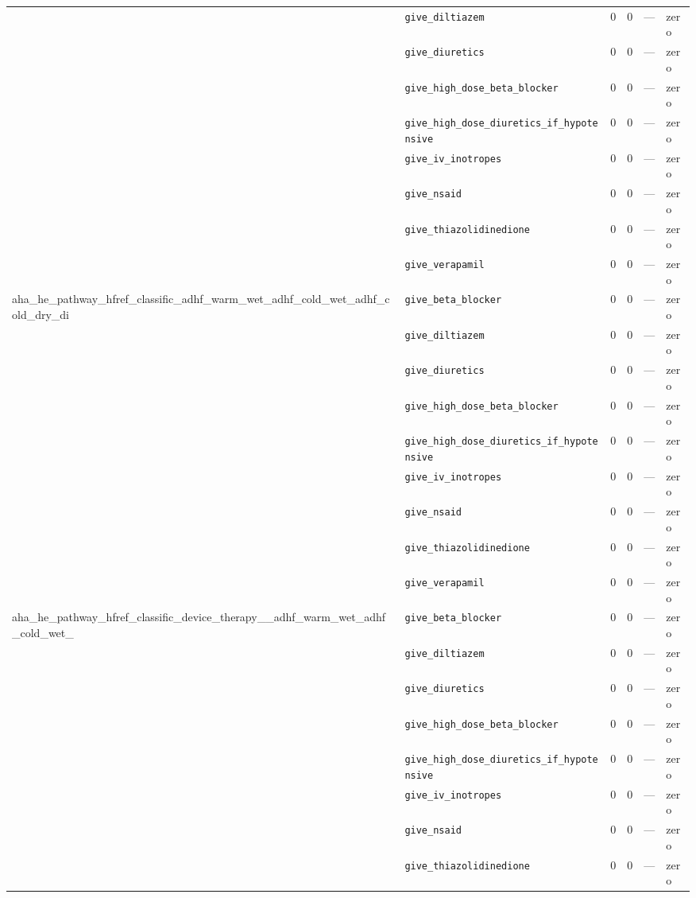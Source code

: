 \begin{table}[ht]
\begin{tabular}{llrrrl}
 & \texttt{give\_diltiazem} & 0 & 0 & — & zero \\
 & \texttt{give\_diuretics} & 0 & 0 & — & zero \\
 & \texttt{give\_high\_dose\_beta\_blocker} & 0 & 0 & — & zero \\
 & \texttt{give\_high\_dose\_diuretics\_if\_hypotensive} & 0 & 0 & — & zero \\
 & \texttt{give\_iv\_inotropes} & 0 & 0 & — & zero \\
 & \texttt{give\_nsaid} & 0 & 0 & — & zero \\
 & \texttt{give\_thiazolidinedione} & 0 & 0 & — & zero \\
 & \texttt{give\_verapamil} & 0 & 0 & — & zero \\
\midrule
aha\_he\_pathway\_hfref\_classific\_adhf\_warm\_wet\_adhf\_cold\_wet\_adhf\_cold\_dry\_di & \texttt{give\_beta\_blocker} & 0 & 0 & — & zero \\
 & \texttt{give\_diltiazem} & 0 & 0 & — & zero \\
 & \texttt{give\_diuretics} & 0 & 0 & — & zero \\
 & \texttt{give\_high\_dose\_beta\_blocker} & 0 & 0 & — & zero \\
 & \texttt{give\_high\_dose\_diuretics\_if\_hypotensive} & 0 & 0 & — & zero \\
 & \texttt{give\_iv\_inotropes} & 0 & 0 & — & zero \\
 & \texttt{give\_nsaid} & 0 & 0 & — & zero \\
 & \texttt{give\_thiazolidinedione} & 0 & 0 & — & zero \\
 & \texttt{give\_verapamil} & 0 & 0 & — & zero \\
\midrule
aha\_he\_pathway\_hfref\_classific\_device\_therapy\_\_adhf\_warm\_wet\_adhf\_cold\_wet\_ & \texttt{give\_beta\_blocker} & 0 & 0 & — & zero \\
 & \texttt{give\_diltiazem} & 0 & 0 & — & zero \\
 & \texttt{give\_diuretics} & 0 & 0 & — & zero \\
 & \texttt{give\_high\_dose\_beta\_blocker} & 0 & 0 & — & zero \\
 & \texttt{give\_high\_dose\_diuretics\_if\_hypotensive} & 0 & 0 & — & zero \\
 & \texttt{give\_iv\_inotropes} & 0 & 0 & — & zero \\
 & \texttt{give\_nsaid} & 0 & 0 & — & zero \\
 & \texttt{give\_thiazolidinedione} & 0 & 0 & — & zero \\

\end{tabular}
\end{table}
